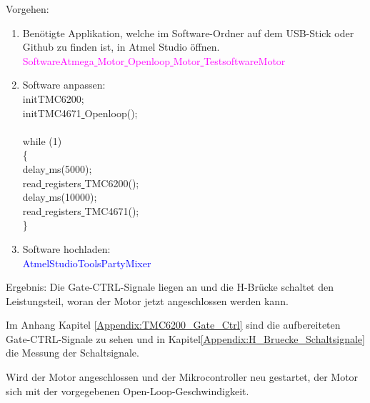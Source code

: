 Vorgehen:
\begin{enumerate}
\item Benötigte Applikation, welche im Software-Ordner auf dem USB-Stick oder Github \cite{aebi_projekt-6softwareatmega_2020} zu finden ist, in Atmel Studio öffnen.\\
\textcolor{magenta}{Software\textrightarrow Atmega\underline{ }Motor\underline{ }Openloop\underline{ }Motor\underline{ }Testsoftware\textrightarrow Motor}\\


\item Software anpassen:\\
\textcolor{OliveGreen}{
	initTMC6200;\\
	initTMC4671\underline{ }Openloop();\\
\\
    while (1) \\
    \{\\
		\underline{ }delay\underline{ }ms(5000);\\
		read\underline{ }registers\underline{ }TMC6200();\\
		\underline{ }delay\underline{ }ms(10000);\\
		read\underline{ }registers\underline{ }TMC4671();\\
    \}
}\newline
\item Software hochladen:\\
\textcolor{blue}{AtmelStudio\textrightarrow Tools\textrightarrow PartyMixer}\\
\end{enumerate}

Ergebnis: Die Gate-CTRL-Signale liegen an und die H-Brücke schaltet den Leistungsteil, woran der Motor jetzt angeschlossen werden kann.

Im Anhang Kapitel \ref{Appendix:TMC6200_Gate_Ctrl} sind die aufbereiteten Gate-CTRL-Signale zu sehen und in Kapitel\ref{Appendix:H_Bruecke_Schaltsignale} die Messung der Schaltsignale.

Wird der Motor angeschlossen und der Mikrocontroller neu gestartet, der Motor sich mit der vorgegebenen Open-Loop-Geschwindigkeit.